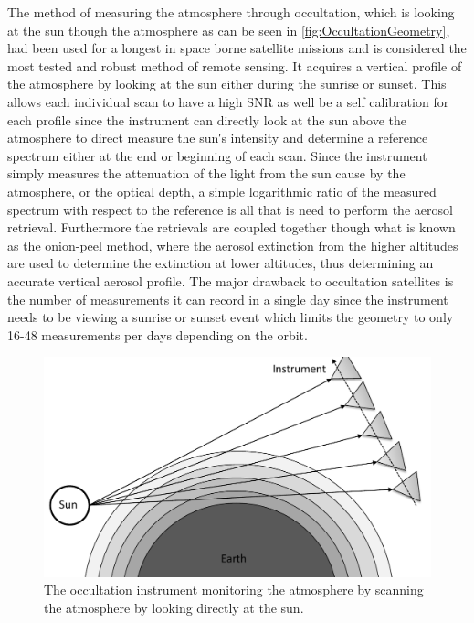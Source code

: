 The method of measuring the atmosphere through occultation, which is looking at the sun though the atmosphere as can be seen in \autoref{fig:OccultationGeometry}, had been used for a longest in space borne satellite missions and is considered the most tested and robust method of remote sensing. It acquires a vertical profile of the atmosphere by looking at the sun either during the sunrise or sunset. This allows each individual scan to have a high SNR as well be a self calibration for each profile since the instrument can directly look at the sun above the atmosphere to direct measure the sun\si{\arcminute}s intensity and determine a reference spectrum either at the end or beginning of each scan. Since the instrument simply measures the attenuation of the light from the sun cause by the atmosphere, or the optical depth, a simple logarithmic ratio of the measured spectrum with respect to the reference is all that is need to perform the aerosol retrieval. Furthermore the retrievals are coupled together though what is known as the onion-peel method, where the aerosol extinction from the higher altitudes are used to determine the extinction at lower altitudes, thus determining an accurate vertical aerosol profile. The major drawback to occultation satellites is the number of measurements it can record in a single day since the instrument needs to be viewing a sunrise or sunset event which limits the geometry to only 16-48 measurements per days depending on the orbit.

\begin{figure}[h]
    \includegraphics[width=1.0\textwidth]{./Images/OccultationGeometry.pdf}
    \caption[Occultation Geometry]{The occultation instrument monitoring the atmosphere by scanning the atmosphere by looking directly at the sun.}
    \label{fig:OccultationGeometry}
\end{figure}

